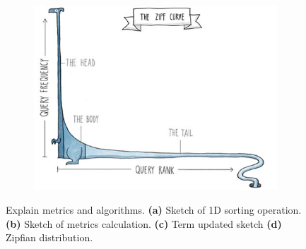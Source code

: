 \begin{figure}[!htb]
\begin{subfigure}[t]{0.4\textwidth}
			\label{fig:pg_sgd_update_sketch}
		\end{subfigure}
		\begin{subfigure}[t]{0.4\textwidth}
			\centering
			\caption{}
			\includegraphics[width=\linewidth]{fig/algorithm/TODO_zipf_curve.jpg}
			\label{fig:fig:zipf_curve}
		\end{subfigure}
	\caption{
		Explain metrics and algorithms.
		\textbf{(a)} Sketch of 1D sorting operation. \textbf{(b)} Sketch of metrics calculation. \textbf{(c)} Term updated sketch \textbf{(d)} Zipfian distribution.
	}
	\label{fig:algorithm}
\end{figure}